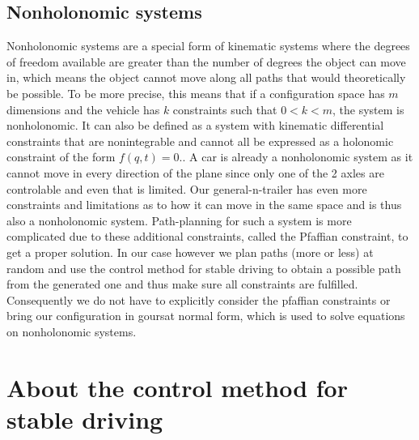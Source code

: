 
\subsection{Nonholonomic systems}
\label{sec:nonholonomic_systems}

Nonholonomic systems are a special form of kinematic systems where the degrees of freedom available are greater than the number of degrees the object can move in, which means the object cannot move along all paths that would theoretically be possible. To be more precise, this means that if a configuration space has $m$ dimensions and the vehicle has $k$ constraints such that $0<k<m$, the system is nonholonomic. It can also be defined as a system with kinematic differential constraints that are nonintegrable and cannot all be expressed as a holonomic constraint of the form $f(q,t)=0$.\cite{29,30}. A car is already a nonholonomic system as it cannot move in every direction of the plane since only one of the 2 axles are controlable and even that is limited. Our general-n-trailer has even more constraints and limitations as to how it can move in the same space and is thus also a nonholonomic system. Path-planning for such a system is more complicated due to these additional constraints, called the Pfaffian constraint, to get a proper solution. 
In our case however we plan paths (more or less) at random and use the control method for stable driving to obtain a possible path from the generated one and thus make sure all constraints are fulfilled. Consequently we do not have to explicitly consider the pfaffian constraints or bring our configuration in goursat normal form, which is used to solve equations on nonholonomic systems.

\section{About the control method for stable driving}
\label{sec:about_control_method}

